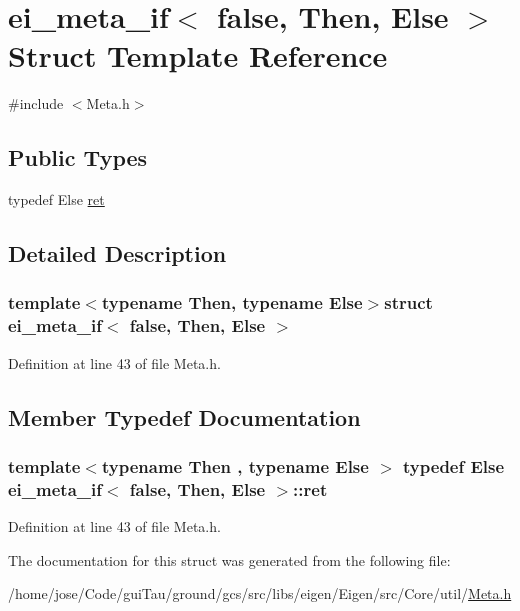 \hypertarget{structei__meta__if_3_01false_00_01_then_00_01_else_01_4}{\section{ei\-\_\-meta\-\_\-if$<$ false, Then, Else $>$ Struct Template Reference}
\label{structei__meta__if_3_01false_00_01_then_00_01_else_01_4}
}


{\ttfamily \#include $<$Meta.\-h$>$}

\subsection*{Public Types}
\begin{DoxyCompactItemize}
\item 
typedef Else \hyperlink{structei__meta__if_3_01false_00_01_then_00_01_else_01_4_ad58f017e0994846c65ea7ffedd9a0dec}{ret}
\end{DoxyCompactItemize}


\subsection{Detailed Description}
\subsubsection*{template$<$typename Then, typename Else$>$struct ei\-\_\-meta\-\_\-if$<$ false, Then, Else $>$}



Definition at line 43 of file Meta.\-h.



\subsection{Member Typedef Documentation}
\hypertarget{structei__meta__if_3_01false_00_01_then_00_01_else_01_4_ad58f017e0994846c65ea7ffedd9a0dec}{
\subsubsection[{ret}]{\setlength{\rightskip}{0pt plus 5cm}template$<$typename Then , typename Else $>$ typedef Else {\bf ei\-\_\-meta\-\_\-if}$<$ false, Then, Else $>$\-::{\bf ret}}}\label{structei__meta__if_3_01false_00_01_then_00_01_else_01_4_ad58f017e0994846c65ea7ffedd9a0dec}


Definition at line 43 of file Meta.\-h.



The documentation for this struct was generated from the following file\-:\begin{DoxyCompactItemize}
\item 
/home/jose/\-Code/gui\-Tau/ground/gcs/src/libs/eigen/\-Eigen/src/\-Core/util/\hyperlink{_meta_8h}{Meta.\-h}\end{DoxyCompactItemize}
